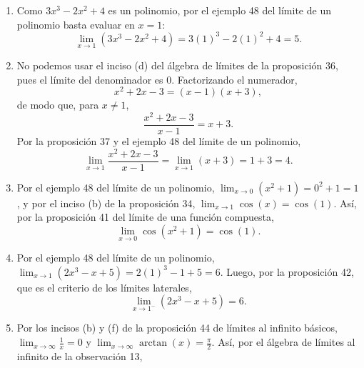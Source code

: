 \documentclass[12pt,a4paper]{article}
\begin{document}
    \begin{solucion}
        \begin{enumerate}
            \item[(a)] Como $3x^{3}-2x^{2}+4$ es un polinomio, por el ejemplo 48 del límite de un polinomio basta evaluar en $x=1$:
            \begin{equation*}
                \lim_{x\to1}\left(3x^{3}-2x^{2}+4\right)=3(1)^{3}-2(1)^{2}+4=5.
            \end{equation*}
            \item[(b)] No podemos usar el inciso (d) del álgebra de límites de la proposición 36, pues el límite del denominador es $0$. Factorizando el numerador,
            \begin{equation*}
                x^{2}+2x-3=(x-1)(x+3),
            \end{equation*}
            de modo que, para $x\neq1$,
            \begin{equation*}
                \frac{x^{2}+2x-3}{x-1}=x+3.
            \end{equation*}
            Por la proposición 37 y el ejemplo 48 del límite de un polinomio,
            \begin{equation*}
                \lim_{x\to1}\frac{x^{2}+2x-3}{x-1}=\lim_{x\to1}(x+3)=1+3=4.
            \end{equation*}
            \item[(c)] Por el ejemplo 48 del límite de un polinomio, $\lim_{x\to0}\left(x^{2}+1\right)=0^{2}+1=1$, y por el inciso (b) de la proposición 34, $\lim_{x\to1}\cos(x)=\cos(1)$. Así, por la proposición 41 del límite de una función compuesta,
            \begin{equation*}
                \lim_{x\to0}\cos\left(x^{2}+1\right)=\cos(1).
            \end{equation*}
            \item[(d)] Por el ejemplo 48 del límite de un polinomio, $\lim_{x\to1}\left(2x^{3}-x+5\right)=2(1)^{3}-1+5=6$. Luego, por la proposición 42, que es el criterio de los límites laterales,
            \begin{equation*}
                \lim_{x\to1^{-}}\left(2x^{3}-x+5\right)=6.
            \end{equation*}
            \item[(e)] Por los incisos (b) y (f) de la proposición 44 de límites al infinito básicos, $\lim_{x\to\infty}\frac{1}{x}=0$ y $\lim_{x\to\infty}\arctan(x)=\frac{\pi}{2}$. Así, por el álgebra de límites al infinito de la observación 13,

\end{enumerate}
\end{solucion}
\end{document}
